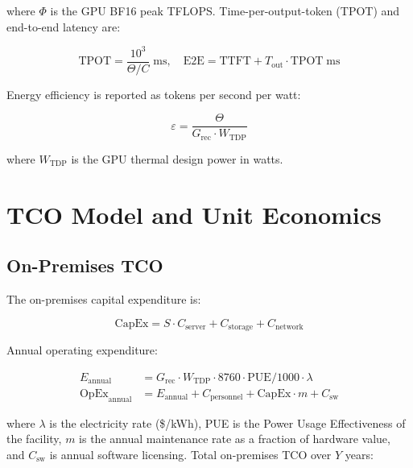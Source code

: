 \documentclass{article}
\begin{document}
\noindent where $\Phi$ is the GPU BF16 peak TFLOPS. Time-per-output-token
(TPOT) and end-to-end latency are:

\begin{equation}
  \text{TPOT} = \frac{10^3}{\Theta / C} \;\text{ms}, \quad
  \text{E2E} = \text{TTFT} + T_{\text{out}} \cdot \text{TPOT} \;\text{ms}
  \label{eq:latency}
\end{equation}

Energy efficiency is reported as tokens per second per watt:

\begin{equation}
  \varepsilon = \frac{\Theta}{G_{\text{rec}} \cdot W_{\text{TDP}}}
  \label{eq:efficiency}
\end{equation}

\noindent where $W_{\text{TDP}}$ is the GPU thermal design power in watts.

\section{TCO Model and Unit Economics}
\label{sec:tco}

\subsection{On-Premises TCO}
\label{sec:onprem_tco}

The on-premises capital expenditure is:

\begin{equation}
  \text{CapEx} = S \cdot C_{\text{server}} + C_{\text{storage}} + C_{\text{network}}
  \label{eq:capex}
\end{equation}

Annual operating expenditure:

\begin{align}
  E_{\text{annual}} &= G_{\text{rec}} \cdot W_{\text{TDP}} \cdot 8760 \cdot
    \text{PUE} / 1000 \cdot \lambda \label{eq:power} \\
  \text{OpEx}_{\text{annual}} &= E_{\text{annual}} + C_{\text{personnel}} +
    \text{CapEx} \cdot m + C_{\text{sw}} \label{eq:opex}
\end{align}

\noindent where $\lambda$ is the electricity rate (\$/kWh), PUE is the Power
Usage Effectiveness of the facility, $m$ is the annual maintenance rate as a
fraction of hardware value, and $C_{\text{sw}}$ is annual software licensing.
Total on-premises TCO over $Y$ years:
\end{document}
